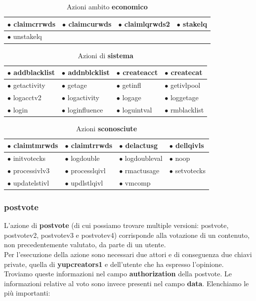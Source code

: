 \begin{table}[t]
    \centering
    \caption{Azioni ambito \textbf{economico}}
    \begin{tabular}{|l|l|l|l|}
    \hline
    $\bullet$ claimcrrwds & $\bullet$ claimcurwds & $\bullet$ claimlqrwds2 & $\bullet$ stakelq \\
    \hline
    $\bullet$ unstakelq \\
    \cline{1-1}
    \end{tabular}
    \label{tab: economy_actions}
\end{table}
\clearpage

\begin{table}[t]
    \centering
    \caption{Azioni di \textbf{sistema}}
    \begin{tabular}{|l|l|l|l|}
    \hline
    $\bullet$ addblacklist & $\bullet$ addnblcklist & $\bullet$ createacct & $\bullet$ createcat \\
    \hline
    $\bullet$ getactivity & $\bullet$ getage & $\bullet$ getinfl & $\bullet$ getivlpool \\
    \hline
    $\bullet$ logacctv2 & $\bullet$ logactivity & $\bullet$ logage & $\bullet$ loggetage \\
    \hline
    $\bullet$ login & $\bullet$ loginfluence & $\bullet$ loguintval & $\bullet$ rmblacklist \\
    \hline
    \end{tabular}
    \label{tab: system_actions}
\end{table}

\begin{table}[t]
    \centering
    \caption{Azioni \textbf{sconosciute}}
    \begin{tabular}{|l|l|l|l|}
    \hline
    $\bullet$ claimtmrwds & $\bullet$ claimtrrwds & $\bullet$ delactusg & $\bullet$ dellqivls \\
    \hline
    $\bullet$ initvotecks & $\bullet$ logdouble & $\bullet$ logdoubleval & $\bullet$ noop \\
    \hline
    $\bullet$ processivlv3 & $\bullet$ processlqivl & $\bullet$ rmactusage & $\bullet$ setvotecks \\
    \hline
    $\bullet$ updatelstivl & $\bullet$ updlstlqivl & $\bullet$ vmcomp \\
    \cline{1-3}
    \end{tabular}
    \label{tab: unknown_actions}
\end{table}

\subsubsection{postvote}
L'azione di \textbf{postvote} (di cui possiamo trovare multiple versioni: postvote, postvotev2, postvotev3 e postvotev4) corrisponde alla votazione di un contenuto, non precedentemente valutato, da parte di un utente.
\\
Per l'esecuzione della azione sono necessari due attori e di conseguenza due chiavi private, quella di \textbf{yupcreators1} e dell'utente che ha espresso l'opinione. Troviamo queste informazioni nel campo \textbf{authorization} della postvote.
Le informazioni relative al voto sono invece presenti nel campo \textbf{data}. Elenchiamo le più importanti:

